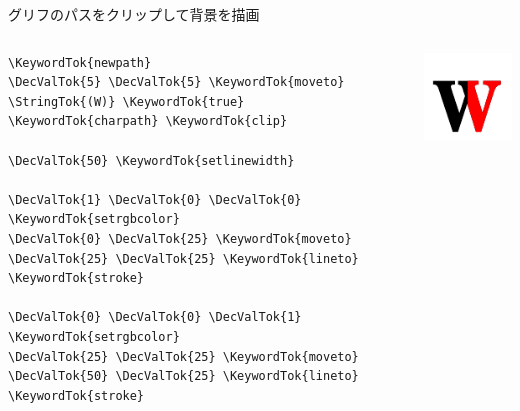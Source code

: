 \documentclass[unicode,14pt]{beamer}
\begin{document}
\begin{frame}[fragile]{グリフのパスをクリップして背景を描画}
  \sffamily
  \vspace*{-\baselineskip}
  \begin{columns}[t]
    \begin{column}{.5\textwidth}
  \begin{tcolorbox}
  \begin{Verbatim}[commandchars=\\\{\}, breaklines=true, breakanywhere=true]
\KeywordTok{newpath}
\DecValTok{5} \DecValTok{5} \KeywordTok{moveto}
\StringTok{(W)} \KeywordTok{true}
\KeywordTok{charpath} \KeywordTok{clip}

\DecValTok{50} \KeywordTok{setlinewidth}

\DecValTok{1} \DecValTok{0} \DecValTok{0} \KeywordTok{setrgbcolor}
\DecValTok{0} \DecValTok{25} \KeywordTok{moveto}
\DecValTok{25} \DecValTok{25} \KeywordTok{lineto}
\KeywordTok{stroke}

\DecValTok{0} \DecValTok{0} \DecValTok{1} \KeywordTok{setrgbcolor}
\DecValTok{25} \DecValTok{25} \KeywordTok{moveto}
\DecValTok{50} \DecValTok{25} \KeywordTok{lineto}
\KeywordTok{stroke}
  \end{Verbatim}
  \end{tcolorbox}
    \end{column}
    \begin{column}{.5\textwidth}
  \begin{center}
    \mbox{}
    \vfill
    \includegraphics[width=.75\textwidth]{figures/temp.pdf}
    \vfill
  \end{center}
    \end{column}
  \end{columns}
\end{frame}
\end{document}
